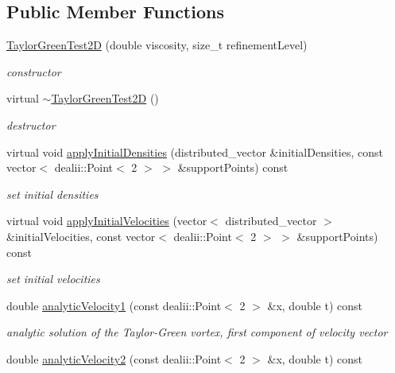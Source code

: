 \subsection*{Public Member Functions}
\begin{DoxyCompactItemize}
\item 
\hyperlink{classTaylorGreenTest2D_a891500a30b0fae0784496f9c219bd31b}{Taylor\-Green\-Test2\-D} (double viscosity, size\-\_\-t refinement\-Level)
\begin{DoxyCompactList}\small\item\em constructor \end{DoxyCompactList}\item 
\hypertarget{classTaylorGreenTest2D_a393d90458a3415572c3d9bebccdcb662}{virtual \hyperlink{classTaylorGreenTest2D_a393d90458a3415572c3d9bebccdcb662}{$\sim$\-Taylor\-Green\-Test2\-D} ()}\label{classTaylorGreenTest2D_a393d90458a3415572c3d9bebccdcb662}

\begin{DoxyCompactList}\small\item\em destructor \end{DoxyCompactList}\item 
virtual void \hyperlink{classTaylorGreenTest2D_a009785acda6f6de9d54982c8282155cc}{apply\-Initial\-Densities} (distributed\-\_\-vector \&initial\-Densities, const vector$<$ dealii\-::\-Point$<$ 2 $>$ $>$ \&support\-Points) const 
\begin{DoxyCompactList}\small\item\em set initial densities \end{DoxyCompactList}\item 
virtual void \hyperlink{classTaylorGreenTest2D_ac450fd99d5a8a0bddf8fea161269a27a}{apply\-Initial\-Velocities} (vector$<$ distributed\-\_\-vector $>$ \&initial\-Velocities, const vector$<$ dealii\-::\-Point$<$ 2 $>$ $>$ \&support\-Points) const 
\begin{DoxyCompactList}\small\item\em set initial velocities \end{DoxyCompactList}\item 
\hypertarget{classTaylorGreenTest2D_a2ae2c4a4ec55242c69a7c9cd60e8bc01}{double \hyperlink{classTaylorGreenTest2D_a2ae2c4a4ec55242c69a7c9cd60e8bc01}{analytic\-Velocity1} (const dealii\-::\-Point$<$ 2 $>$ \&x, double t) const }\label{classTaylorGreenTest2D_a2ae2c4a4ec55242c69a7c9cd60e8bc01}

\begin{DoxyCompactList}\small\item\em analytic solution of the Taylor-\/\-Green vortex, first component of velocity vector \end{DoxyCompactList}\item 
\hypertarget{classTaylorGreenTest2D_af7c07357ef5c57c46218b9c65e45572d}{double \hyperlink{classTaylorGreenTest2D_af7c07357ef5c57c46218b9c65e45572d}{analytic\-Velocity2} (const dealii\-::\-Point$<$ 2 $>$ \&x, double t) const }\label{classTaylorGreenTest2D_af7c07357ef5c57c46218b9c65e45572d}


\end{DoxyCompactItemize}
